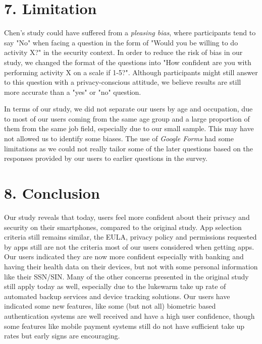\documentclass{sigchi}
\begin{document}
\section{7. Limitation}
Chen's study could have suffered from a \textit{pleasing bias}, where participants tend to say "No" when facing a question in the form of "Would you be willing to do activity X?" in the security context. In order to reduce the risk of bias in our study, we changed the format of the questions into "How confident are you with performing activity X on a scale if 1-5?". Although participants might still answer to this question with a privacy-conscious attitude, we believe results are still more accurate than a "yes" or "no" question.

In terms of our study, we did not separate our users by age and occupation, due to most of our users coming from the same age group and a large proportion of them from the same job field, especially due to our small sample. This may have not allowed us to identify some biases. The use of \textit{Google Forms} had some limitations as we could not really tailor some of the later questions based on the responses provided by our users to earlier questions in the survey.

\section{8. Conclusion}

Our study reveals that today, users feel more confident about their privacy and security on their smartphones, compared to the original study. App selection criteria still remains similar, the EULA, privacy policy and permissions requested by apps still are not the criteria most of our users considered when getting apps. Our users indicated they are now more confident especially with banking and having their health data on their devices, but not with some personal information like their SSN/SIN. Many of the other concerns presented in the original study still apply today as well, especially due to the lukewarm take up rate of automated backup services and device tracking solutions. Our users have indicated some new features, like some (but not all) biometric based authentication systems are well received and have a high user confidence, though some features like mobile payment systems still do not have sufficient take up rates but early signs are encouraging.


%
%
{\footnotesize 
}
\end{document}
